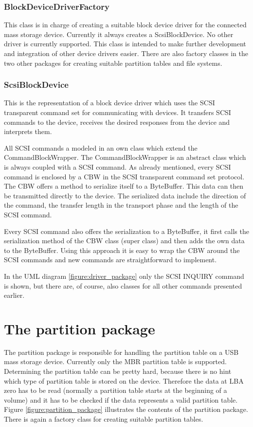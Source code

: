 \subsubsection{BlockDeviceDriverFactory}

This class is in charge of creating a suitable block device driver for the connected mass storage device. Currently it always creates a ScsiBlockDevice. No other driver is currently supported. This class is intended to make further development and integration of other device drivers easier. There are also factory classes in the two other packages for creating suitable partition tables and file systems.

\subsubsection{ScsiBlockDevice}

This is the representation of a block device driver which uses the SCSI transparent command set for communicating with devices. It transfers SCSI commands to the device, receives the desired responses from the device and interprets them.

All SCSI commands a modeled in an own class which extend the CommandBlockWrapper. The CommandBlockWrapper is an abstract class which is always coupled with a SCSI command. As already mentioned, every SCSI command is enclosed by a CBW in the SCSI transparent command set protocol. The CBW offers a method to serialize itself to a ByteBuffer. This data can then be transmitted directly to the device. The serialized data include the direction of the command, the transfer length in the transport phase and the length of the SCSI command.

Every SCSI command also offers the serialization to a ByteBuffer, it first calls the serialization method of the CBW class (super class) and then adds the own data to the ByteBuffer. Using this approach it is easy to wrap the CBW around the SCSI commands and new commands are straightforward to implement. 

In the UML diagram \ref{figure:driver_package} only the SCSI INQUIRY command is shown, but there are, of course, also classes for all other commands presented earlier.

\section{The partition package}

The partition package is responsible for handling the partition table on a USB mass storage device. Currently only the MBR partition table is supported. Determining the partition table can be pretty hard, because there is no hint which type of partition table is stored on the device. Therefore the data at LBA zero has to be read (normally a partition table starts at the beginning of a volume) and it has to be checked if the data represents a valid partition table. Figure \ref{figure:partition_package} illustrates the contents of the partition package. There is again a factory class for creating suitable partition tables.

